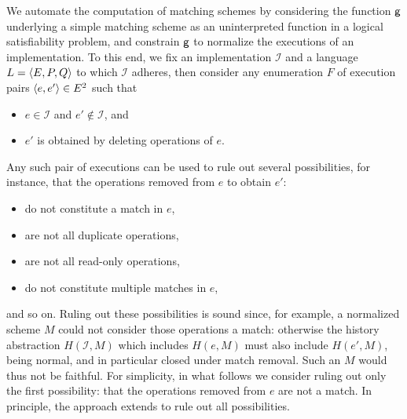 We automate the computation of matching schemes by considering the function
${\sf g}$ underlying a simple matching scheme as an uninterpreted function in a
logical satisfiability problem, and constrain ${\sf g}$ to normalize the
executions of an implementation. To this end, we fix an implementation
$\mathcal{I}$ and a language $L = {\left\langle{E,P,Q}\right\rangle}$ to which $\mathcal{I}$ adheres,
then consider any enumeration $F$ of execution pairs ${\left\langle{e,e'}\right\rangle} \in E^2$ such
that
\begin{itemize}

  \item $e \in \mathcal{I}$ and $e' \not\in \mathcal{I}$, and

  \item $e'$ is obtained by deleting operations of $e$.

\end{itemize}
Any such pair of executions can be used to rule out several possibilities,
for instance, that the operations removed from $e$ to obtain $e'$:
\begin{itemize}

  \item do not constitute a match in $e$,

  \item are not all duplicate operations,

  \item are not all read-only operations,

  \item do not constitute multiple matches in $e$,

\end{itemize}
and so on. Ruling out these possibilities is sound since, for example, a
normalized scheme $M$ could not consider those operations a match: otherwise
the history abstraction $H(\mathcal{I},M)$ which includes $H(e,M)$ must also
include $H(e',M)$, being normal, and in particular closed under match removal.
Such an $M$ would thus not be faithful. For simplicity, in what follows we
consider ruling out only the first possibility: that the operations removed
from $e$ are not a match. In principle, the approach extends to rule out all
possibilities.

